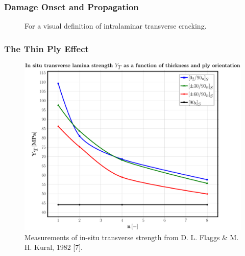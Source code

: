 \documentclass[first,firstsupp,lastsupp,last,hyperref,table]{ETHclass}
\begin{document}
\begin{frame}
\frametitle{\small Damage Onset and Propagation}
\vspace{-0.75cm}
\centering
\captionsetup[subfigure]{labelfont=footnotesize}
\begin{figure}[!h]
\centering
{}\quad
{}
 \caption{For a visual definition of intralaminar transverse cracking.}
  \label{fig:intralaminar-cracks}
\end{figure}
\end{frame}

\begin{frame}
\frametitle{\small The Thin Ply Effect}
\vspace{-0.25cm}
\centering
\begin{figure}[!h]
\centering
\includegraphics[height=0.75\textheight]{Flaggs-Kural_InSituTransverseStrength.pdf}
\vspace*{-0.3cm}
\caption{\tiny Measurements of in-situ transverse strength from D. L. Flaggs \& M. H. Kural, 1982 [7].}
 \label{fig:in-situ-strength}
\end{figure}
\end{frame}
\end{document}
